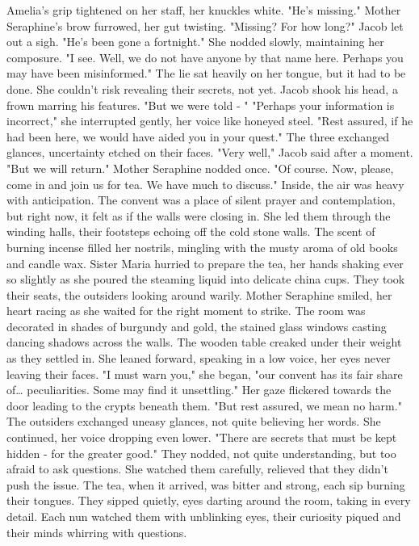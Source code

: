 \documentclass[11pt]{article}
\begin{document}
Amelia's grip tightened on her staff, her knuckles white. "He's missing."
Mother Seraphine's brow furrowed, her gut twisting. "Missing? For how long?"
Jacob let out a sigh. "He's been gone a fortnight."
She nodded slowly, maintaining her composure. "I see. Well, we do not have anyone by that name here. Perhaps you may have been misinformed."
The lie sat heavily on her tongue, but it had to be done. She couldn't risk revealing their secrets, not yet.
Jacob shook his head, a frown marring his features. "But we were told - "
"Perhaps your information is incorrect," she interrupted gently, her voice like honeyed steel. "Rest assured, if he had been here, we would have aided you in your quest."
The three exchanged glances, uncertainty etched on their faces. "Very well," Jacob said after a moment. "But we will return."
Mother Seraphine nodded once. "Of course. Now, please, come in and join us for tea. We have much to discuss."
Inside, the air was heavy with anticipation. The convent was a place of silent prayer and contemplation, but right now, it felt as if the walls were closing in. She led them through the winding halls, their footsteps echoing off the cold stone walls. The scent of burning incense filled her nostrils, mingling with the musty aroma of old books and candle wax. Sister Maria hurried to prepare the tea, her hands shaking ever so slightly as she poured the steaming liquid into delicate china cups.
They took their seats, the outsiders looking around warily. Mother Seraphine smiled, her heart racing as she waited for the right moment to strike. The room was decorated in shades of burgundy and gold, the stained glass windows casting dancing shadows across the walls. The wooden table creaked under their weight as they settled in.
She leaned forward, speaking in a low voice, her eyes never leaving their faces. "I must warn you," she began, "our convent has its fair share of\ldots{} peculiarities. Some may find it unsettling." Her gaze flickered towards the door leading to the crypts beneath them. "But rest assured, we mean no harm."
The outsiders exchanged uneasy glances, not quite believing her words.
She continued, her voice dropping even lower. "There are secrets that must be kept hidden - for the greater good." They nodded, not quite understanding, but too afraid to ask questions. She watched them carefully, relieved that they didn't push the issue.
The tea, when it arrived, was bitter and strong, each sip burning their tongues. They sipped quietly, eyes darting around the room, taking in every detail. Each nun watched them with unblinking eyes, their curiosity piqued and their minds whirring with questions.
\end{document}
